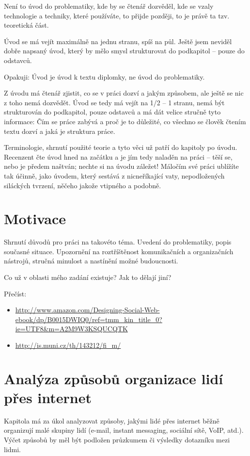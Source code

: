 \documentclass[12pt,oneside,final]{fithesis2}
\begin{document}
Není to úvod do problematiky, kde by se čtenář dozvěděl, kde se vzaly technologie a techniky, které používáte, to přijde později, to je právě ta tzv. teoretická část.

Úvod se má vejít maximálně na jednu stranu, spíš na půl. Ještě jsem neviděl dobře napsaný úvod, který by mělo smysl strukturovat do podkapitol – pouze do odstavců.

Opakuji: Úvod je úvod k textu diplomky, ne úvod do problematiky.

Z úvodu má čtenář zjistit, co se v práci dozví a jakým způsobem, ale ještě se nic z toho nemá dozvědět. Úvod se tedy má vejít na 1/2 – 1 stranu, nemá být strukturován do podkapitol, pouze odstavců a má dát velice stručně tyto informace: Čím se práce zabývá a proč je to důležité, co všechno se člověk čtením textu dozví a jaká je struktura práce.

Terminologie, shrnutí použité teorie a tyto věci už patří do kapitoly po úvodu. Recenzent čte úvod hned na začátku a je jím tedy naladěn na práci – těší se, nebo je předem naštván; nechte si na úvodu záležet! Máločím své práci ublížíte tak účinně, jako úvodem, který sestává z nicneříkající vaty, nepodložených siláckých tvrzení, něčeho jakože vtipného a podobně.

\chapter{Motivace}
Shrnutí důvodů pro práci na takovéto téma. Uvedení do problematiky, popis současné situace. Upozornění na roztříštěnost komunikačních a organizačních nástrojů, stručná minulost a nastínění možné budoucnosti.

Co už v oblasti mého zadání existuje? Jak to dělají jiní?

Přečíst:
\begin{itemize}
    \item \url{http://www.amazon.com/Designing-Social-Web-ebook/dp/B0015DWIQ0/ref=tmm_kin_title_0?ie=UTF8&m=A2M9W3KSQUCQTK}
    \item \url{http://is.muni.cz/th/143212/fi_m/}
\end{itemize}

\chapter{Analýza způsobů organizace lidí přes internet}
Kapitola má za úkol analyzovat způsoby, jakými lidé přes internet běžně
organizují malé skupiny lidí (e-mail, instant messaging, sociální sítě,
VoIP, atd.). Výčet způsobů by měl být podložen průzkumem či výsledky dotazníku mezi lidmi.
\end{document}

